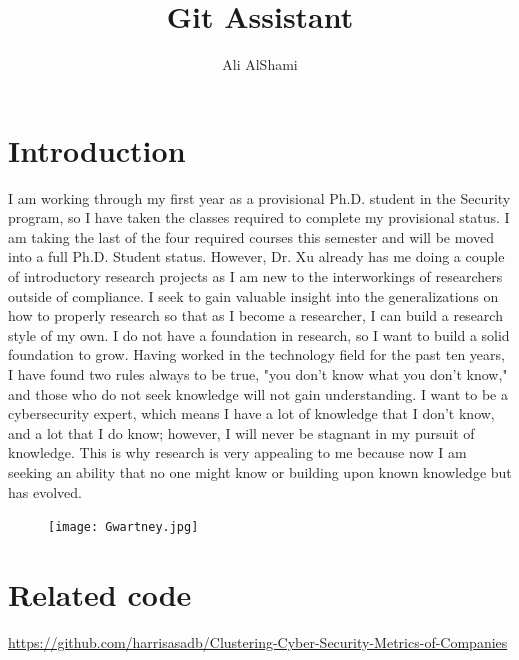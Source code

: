 \title{Git Assistant}
\author{Ali AlShami}


\section{Introduction}
I am working through my first year as a provisional Ph.D. student in the Security program, so I have taken the 
classes required to complete my provisional status. I am taking the last of the four required courses this semester and 
will be moved into a full Ph.D. Student status. However, Dr. Xu already has me doing a couple of introductory
 research projects as I am new to the interworkings of researchers outside of compliance.
  I seek to gain valuable insight into the generalizations on how to properly research so that as I become a researcher,
   I can build a research style of my own. I do not have a foundation in research, so I want to build a solid foundation to grow. 
   Having worked in the technology field for the past ten years, I have found two rules always to be true, "you don't know what you don't know,"
    and those who do not seek knowledge will not gain understanding. I want to be a cybersecurity expert, which means I have a lot of knowledge 
    that I don't know, and a lot that I do know; however, I will never be stagnant in my pursuit of knowledge. This is why research is 
very appealing to me because now I am seeking an ability that no one might know or building upon known knowledge but has evolved.  

\begin{figure}[hbt!]
    \centering
    \texttt{[image: Gwartney.jpg]}
    \caption{ }
    \label{fig:Remove}
\end{figure}

\section{Related code}

\url{https://github.com/harrisasadb/Clustering-Cyber-Security-Metrics-of-Companies}

